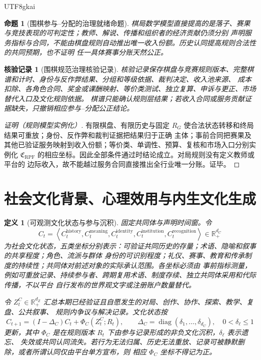 \documentclass[12pt,a4paper,openany]{report}
\newtheorem{definition}{定义}[chapter]
\newtheorem{proposition}{命题}[chapter]
\newtheorem{Certificate}{核验记录}[chapter]
\newcommand{\RR}{\mathbb R}
\newcommand{\Tuple}[1]{\left\langle #1\right\rangle}
\begin{document}
\begin{CJK*}{UTF8}{gkai}
\begin{proposition}[围棋参与--分配的治理就绪命题]
棋局数学模型直接提高的是落子、赛果与竞技表现的可判定性；教师、解说、传播和组织者的经济贡献仍须分别
声明服务指标与合同，不能由棋盘规则自动推出唯一收入份额。历史认同提高规则合法性的共同预期，也不证明
任一具体赛事分账天然公正。
\end{proposition}

\begin{Certificate}[围棋规范治理核验记录]
核验记录保存棋盘与竞赛规则版本、完整棋谱和计时、身份与反作弊结果、分组和等级依据、裁判决定、收入池来源、
成本扣除、各角色合同、奖金或课酬映射、等价类测试、独立复算、申诉与更正、市场替代入口及文化规则依据。
棋谱只能确认规则层结果；若收入合同或服务贡献证据缺失，只撤销相应参与--分配公正结论。
\end{Certificate}

\begin{proof}[证明（规则模型实例化）]
有限棋盘、有限历史与固定 \(R_G\) 使合法状态转移和终局结果可重放；身份、反作弊和裁判证据把结果归于正确
主体；事前合同把赛果及其他已验证服务映射到收入份额；等价类、单调性、预算、复核和市场入口分别实例化
\(\mathfrak C_{\mathrm{RPF}}\) 的相应坐标。因此全部条件通过时结论成立。对局规则没有定义教师或平台的
边际收入，故不能越过服务合同直接推出全行业唯一分账。证毕。
\end{proof}

\section{社会文化背景、心理效用与内生文化生成}
\label{sec:endogenous-cultural-background}

\begin{definition}[可观测文化状态与参与沉积]
固定共同体与声明时间窗。令
\[
  C_t
  =
  \Tuple{
  C_t^{\mathrm{history}},
  C_t^{\mathrm{meaning}},
  C_t^{\mathrm{identity}},
  C_t^{\mathrm{institution}},
  C_t^{\mathrm{recognition}}
  }
  \in\RR_+^{d_C}
\]
为社会文化状态，五类坐标分别表示：可验证共同历史的存量；术语、隐喻和叙事的共享程度；角色、流派与群体
身份的可识别程度；礼仪、赛事、教育和传承制度的持续性；共同体对前述对象的实际承认范围。各坐标必须由
事前指标测量，例如可重放记录、持续参与者、跨期复用术语、制度存续、独立共同体采用和代际传播，不以平台
自行发布的世界观文字或注册账户数量替代。

令 \(Z_t^C\in\RR_+^{d_Z}\) 汇总本期已经验证且自愿发生的对局、创作、协作、探索、教学、复盘、公共叙事、
规则内争议与解决记录。文化状态按
\[
  C_{t+1}
  =
  (I-\Delta_C)C_t+\Phi_C(Z_t^C;R_t),
  \qquad
  \Delta_C=\operatorname{diag}(\delta_1,\ldots,\delta_{d_C}),
  \quad
  0<\delta_\ell\le1
\]
更新，其中 \(\Phi_C\) 是在规则版本 \(R_t\) 下由参与记录形成的非负文化沉积，\(\delta_\ell\) 表示遗忘、
失效或共同认同流失。若行为无法归属、历史无法重放、记录可被静默删除，或者所谓认同仅由平台单方宣布，则
相应 \(\Phi_C\) 坐标不得记为正。
\end{definition}


\end{CJK*}
\end{document}
